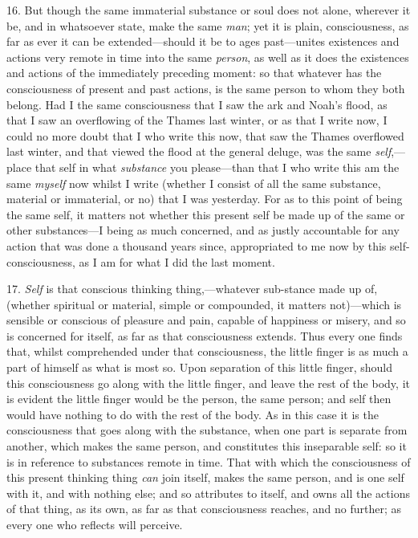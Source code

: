 16. But though the same immaterial substance or soul does
not alone, wherever it be, and in whatsoever state, make the same
\textit{man}; yet it is plain, consciousness, as far as ever it can be
ex\-tend\-ed---should it be to ages past---u\-nites existences and
actions very remote in time into the same \textit{person}, as well as
it does the existences and actions of the immediately preceding
moment: so that whatever has the consciousness of present and past
actions, is the same person to whom they both belong. Had I the same
consciousness that I saw the ark and Noah's flood, as that I saw an
overflowing of the Thames last winter, or as that I write now, I could
no more doubt that I who write this now, that saw the Thames
overflowed last winter, and that viewed the flood at the general
deluge, was the same \textit{self},---place that self in what
\textit{substance} you please---than that I who write this am the same
\textit{myself} now whilst I write (whether I consist of all the same
substance, material or immaterial, or no) that I was yesterday. For as
to this point of being the same self, it matters not whether this
present self be made up of the same or other sub\-stanc\-es---I being
as much concerned, and as justly accountable for any action that was
done a thousand years since, appropriated to me now by this
self-consciousness, as I am for what I did the last moment.

17. \textit{Self} is that conscious thinking thing,---whatever
sub-stance made up of, (whether spiritual or material,
simple or compounded, it matters not)---which is sensible or conscious
of pleasure and pain, capable of happiness or misery, and so is
concerned for itself, as far as that consciousness extends. Thus every
one finds that, whilst comprehended under that consciousness, the
little finger is as much a part of himself as what is most so. Upon
separation of this little finger, should this consciousness go along
with the little finger, and leave the rest of the body, it is evident
the little finger would be the person, the same person; and self then
would have nothing to do with the rest of the body. As in this case it
is the consciousness that goes along with the substance, when one part
is separate from another, which makes the same person, and constitutes
this inseparable self: so it is in reference to substances remote in
time. That with which the consciousness of this present thinking thing
\textit{can} join itself, makes the same person, and is one self with
it, and with nothing else; and so attributes to itself, and owns all
the actions of that thing, as its own, as far as that consciousness
reaches, and no further; as every one who reflects will perceive.


